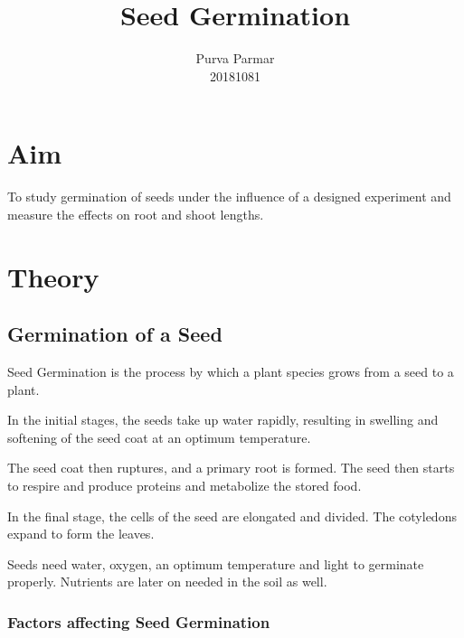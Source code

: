 \documentclass[twocolumn]{article}
\title{Seed Germination}
\author{Purva Parmar \\ 20181081}
\date{}
\begin{document}
\maketitle

\graphicspath{{./Images/}}

\setlength{\parindent}{0pt}
\setlength{\parskip}{\baselineskip}

\begin{strip}
\tableofcontents
\vspace{3em}
\end{strip}


\section{Aim}
To study germination of seeds under the influence of a designed experiment and measure the effects on root and shoot lengths.

\section{Theory}

\subsection{Germination of a Seed}

Seed Germination is the process by which a plant species grows from a seed to a plant. 

In the initial stages, the seeds take up water rapidly, resulting in swelling and softening of the seed coat at an optimum temperature. 

The seed coat then ruptures, and a primary root is formed. The seed then starts to respire and produce proteins and metabolize the stored food. 

In the final stage, the cells of the seed are elongated and divided. The cotyledons expand to form the leaves. 

Seeds need water, oxygen, an optimum temperature and light to germinate properly. Nutrients are later on needed in the soil as well.

\subsubsection{Factors affecting Seed Germination}
\end{document}
